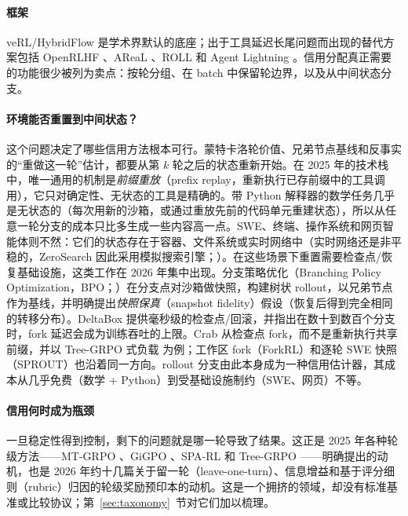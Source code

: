 \paragraph{框架}
veRL/HybridFlow \citep{sheng2025hybridflow} 是学术界默认的底座；出于工具延迟长尾问题而出现的替代方案包括 OpenRLHF \citep{hu2024openrlhf}、AReaL \citep{fu2025areal}、ROLL \citep{wang2025reinforcement} 和 Agent Lightning \citep{luo2025agent}。信用分配真正需要的功能很少被列为卖点：按轮分组、在 batch 中保留轮边界，以及从中间状态分支。

\paragraph{环境能否重置到中间状态？}
这个问题决定了哪些信用方法根本可行。蒙特卡洛轮价值、兄弟节点基线和反事实的“重做这一轮”估计，都要从第 $k$ 轮之后的状态重新开始。在 2025 年的技术栈中，唯一通用的机制是\emph{前缀重放}（prefix replay，重新执行已存前缀中的工具调用），它只对确定性、无状态的工具是精确的。带 Python 解释器的数学任务几乎是无状态的（每次用新的沙箱，或通过重放先前的代码单元重建状态），所以从任意一轮分支的成本只比多生成一些内容高一点。SWE、终端、操作系统和网页智能体则不然：它们的状态存在于容器、文件系统或实时网络中（实时网络还是非平稳的，ZeroSearch 因此采用模拟搜索引擎；\citealp{sun2025zerosearch}）。在这些场景下重置需要检查点/恢复基础设施，这类工作在 2026 年集中出现。分支策略优化（Branching Policy Optimization，BPO；\citealp{bpo2026branching}）在分支点对沙箱做快照，构建树状 rollout，以兄弟节点作为基线，并明确提出\emph{快照保真}（snapshot fidelity）假设（恢复后得到完全相同的转移分布）。DeltaBox \citep{deltabox2026} 提供毫秒级的检查点/回滚，并指出在数十到数百个分支时，fork 延迟会成为训练吞吐的上限。Crab \citep{crab2026} 从检查点 fork，而不是重新执行共享前缀，并以 Tree-GRPO 式负载 \citep{ji2025tree} 为例；工作区 fork（ForkRL）和逐轮 SWE 快照（SPROUT）也沿着同一方向\unverified。rollout 分支由此本身成为一种信用估计器，其成本从几乎免费（数学 + Python）到受基础设施制约（SWE、网页）不等。

\paragraph{信用何时成为瓶颈}
一旦稳定性得到控制，剩下的问题就是哪一轮导致了结果。这正是 2025 年各种轮级方法——MT-GRPO \citep{wei2025reinforcing}、GiGPO \citep{feng2025group}、SPA-RL \citep{wang2025spa} 和 Tree-GRPO \citep{ji2025tree}——明确提出的动机，也是 2026 年约十几篇关于留一轮（leave-one-turn）、信息增益和基于评分细则（rubric）归因的轮级奖励预印本的动机\unverified。这是一个拥挤的领域，却没有标准基准或比较协议；第~\ref{sec:taxonomy}~节对它们加以梳理。
